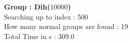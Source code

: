 \textbf{Group : Dih($10000$)}\\
Searching up to index : 500\\
How many normal groups are found : 19\\
Total Time in s : 309.0\\
